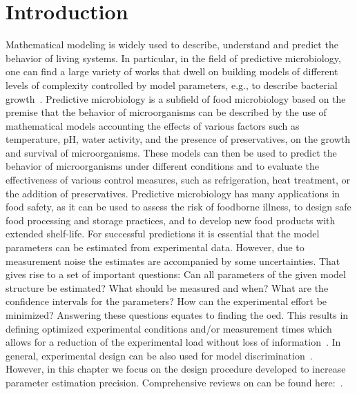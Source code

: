 \documentclass[graybox]{svmult}
\begin{document}
\section{Introduction}
Mathematical modeling is widely used to describe, understand and predict the behavior of living systems.
In particular, in the field of predictive microbiology, one can find a large variety of works that dwell on building models of different levels of complexity controlled by model parameters, e.g., to describe bacterial growth~\cite{bernaertsConceptsToolsPredictive2004}.
Predictive microbiology is a subfield of food microbiology based on the premise that the behavior of microorganisms can be described by the use of mathematical models accounting the effects of various factors such as temperature, pH, water activity, and the presence of preservatives, on the growth and survival of microorganisms.
These models can then be used to predict the behavior of microorganisms under different conditions and to evaluate the effectiveness of various control measures, such as refrigeration, heat treatment, or the addition of preservatives.
Predictive microbiology has many applications in food safety, as it can be used to assess the risk of foodborne illness, to design safe food processing and storage practices, and to develop new food products with extended shelf-life.
For successful predictions it is essential that the model parameters can be estimated from experimental data.
However, due to measurement noise the estimates are accompanied by some uncertainties.
That gives rise to a set of important questions: Can all parameters of the given model structure be estimated?
What should be measured and when? What are the confidence intervals for the parameters? How can the experimental effort be minimized?
Answering these questions equates to finding the \ac{oed}.
This results in defining optimized experimental conditions and/or measurement times which allows for a reduction of the experimental load without loss of information~\cite{derlindenImpactExperimentDesign2013, balsa-cantoe.bangaj.r.COMPUTINGOPTIMALDYNAMIC2008}.
In general, experimental design can be also used for model discrimination~\cite{kreutzSystemsBiology2009, stamatiOptimalExperimentalDesign2016}.
However, in this chapter we focus on the design procedure developed to increase parameter estimation precision.
Comprehensive reviews on can be found here:~\cite{atkinsonDevelopmentsDesignExperiments1982, franceschiniModelbasedDesignExperiments2008,sunParameterEstimation2011,vilasPredictiveFood2016}.
\end{document}

